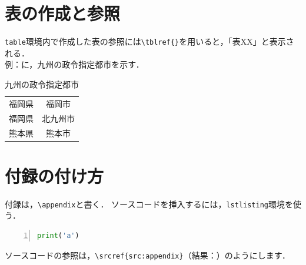 \documentclass{exp_report}
\begin{document}
\section{表の作成と参照}
\verb|table|環境内で作成した表の参照には\verb|\tblref{}|を用いると，「表XX」と表示される．\\
例：に，九州の政令指定都市を示す．
\begin{table}[h]
    \centering
    \caption{九州の政令指定都市}
    \label{tbl:九州の政令指定都市}
    \begin{tabular}{cc}
        \hline
        福岡県 & 福岡市  \\
        福岡県 & 北九州市 \\
        熊本県 & 熊本市  \\
        \hline
    \end{tabular}
\end{table}
\appendix %
\section{付録の付け方}
付録は，\verb|\appendix|と書く．
ソースコードを挿入するには，\verb|lstlisting|環境を使う．
\begin{lstlisting}[caption={付録です},language={python},label={src:appendix},frame={single},basicstyle={\ttfamily},numbers={left}]
print('a')
\end{lstlisting}
ソースコードの参照は，\verb|\srcref{src:appendix}|（結果：）のようにします．
\end{document}
